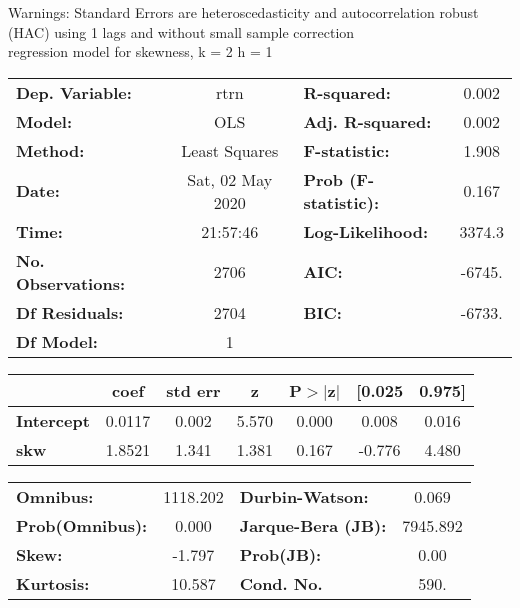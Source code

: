 Warnings: \newline
 [1] Standard Errors are heteroscedasticity and autocorrelation robust (HAC) using 1 lags and without small sample correction\\ 

regression model for skewness, k = 2 h = 1\begin{center}
\begin{tabular}{lclc}
\toprule
\textbf{Dep. Variable:}    &       rtrn       & \textbf{  R-squared:         } &     0.002   \\
\textbf{Model:}            &       OLS        & \textbf{  Adj. R-squared:    } &     0.002   \\
\textbf{Method:}           &  Least Squares   & \textbf{  F-statistic:       } &     1.908   \\
\textbf{Date:}             & Sat, 02 May 2020 & \textbf{  Prob (F-statistic):} &    0.167    \\
\textbf{Time:}             &     21:57:46     & \textbf{  Log-Likelihood:    } &    3374.3   \\
\textbf{No. Observations:} &        2706      & \textbf{  AIC:               } &    -6745.   \\
\textbf{Df Residuals:}     &        2704      & \textbf{  BIC:               } &    -6733.   \\
\textbf{Df Model:}         &           1      & \textbf{                     } &             \\
\bottomrule
\end{tabular}
\begin{tabular}{lcccccc}
                   & \textbf{coef} & \textbf{std err} & \textbf{z} & \textbf{P$> |$z$|$} & \textbf{[0.025} & \textbf{0.975]}  \\
\midrule
\textbf{Intercept} &       0.0117  &        0.002     &     5.570  &         0.000        &        0.008    &        0.016     \\
\textbf{skw}       &       1.8521  &        1.341     &     1.381  &         0.167        &       -0.776    &        4.480     \\
\bottomrule
\end{tabular}
\begin{tabular}{lclc}
\textbf{Omnibus:}       & 1118.202 & \textbf{  Durbin-Watson:     } &    0.069  \\
\textbf{Prob(Omnibus):} &   0.000  & \textbf{  Jarque-Bera (JB):  } & 7945.892  \\
\textbf{Skew:}          &  -1.797  & \textbf{  Prob(JB):          } &     0.00  \\
\textbf{Kurtosis:}      &  10.587  & \textbf{  Cond. No.          } &     590.  \\
\bottomrule
\end{tabular}
\end{center}

